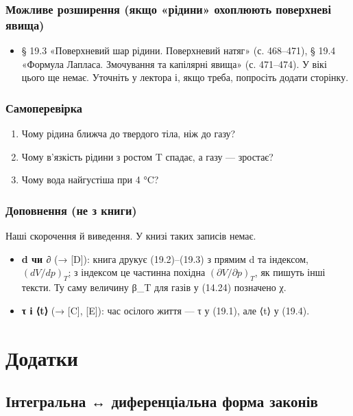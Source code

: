 \documentclass[11pt,a4paper,oneside]{book}
\begin{document}
\section*{Можливе розширення (якщо «рідини» охоплюють поверхневі явища)}
\begin{itemize}
\item § 19.3 «Поверхневий шар рідини. Поверхневий натяг» (с. 468–471), § 19.4 «Формула Лапласа. Змочування та капілярні явища» (с. 471–474). У вікі цього ще немає. Уточніть у лектора і, якщо треба, попросіть додати сторінку.
\end{itemize}

\section*{Самоперевірка}
\begin{enumerate}
\item Чому рідина ближча до твердого тіла, ніж до газу?
\item Чому в'язкість рідини з ростом T спадає, а газу — зростає?
\item Чому вода найгустіша при 4 °C?
\end{enumerate}

\section*{Доповнення (не з книги)}
Наші скорочення й виведення. У книзі таких записів немає.
\begin{itemize}
\item \textbf{d чи ∂} (→ [D]): книга друкує (19.2)–(19.3) з прямим d та індексом, $(dV/dp)_T$; з індексом це частинна похідна $(\partial V/\partial p)_T$, як пишуть інші тексти. Ту саму величину β\_T для газів у (14.24) позначено χ.
\item \textbf{τ і ⟨t⟩} (→ [C], [E]): час осілого життя — τ у (19.1), але ⟨t⟩ у (19.4).
\end{itemize}

\appendix

\part{Додатки}

\chapter*{Інтегральна ↔ диференціальна форма законів}
\end{document}
